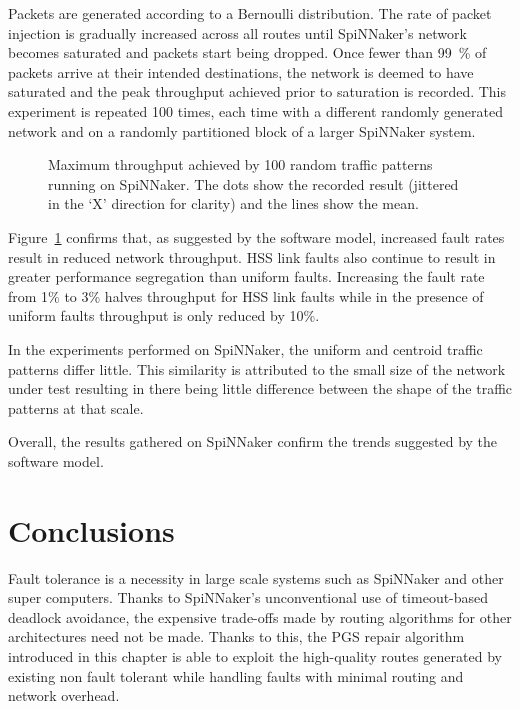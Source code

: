				Packets are generated according to a Bernoulli distribution. The rate
				of packet injection is gradually increased across all routes until
				SpiNNaker's network becomes saturated and packets start being dropped.
				Once fewer than \SI{99}{\percent} of packets arrive at their intended
				destinations, the network is deemed to have saturated and the peak
				throughput achieved prior to saturation is recorded. This experiment is
				repeated 100 times, each time with a different randomly generated
				network and on a randomly partitioned block of a larger SpiNNaker
				system.
				
				\begin{figure}
					\center
					
					\caption{Maximum throughput achieved by \num{100} random traffic
					patterns running on SpiNNaker. The dots show the recorded result
					(jittered in the `X' direction for clarity) and the lines show the
					mean.}
					\label{fig:routing-hardware}
				\end{figure}
				
				Figure~\ref{fig:routing-hardware} confirms that, as suggested by the
				software model, increased fault rates result in reduced network
				throughput. HSS link faults also continue to result in greater
				performance segregation than uniform faults. Increasing the fault rate
				from 1\% to 3\% halves throughput for HSS link faults while in the
				presence of uniform faults throughput is only reduced by 10\%.
				
				In the experiments performed on SpiNNaker, the uniform and centroid
				traffic patterns differ little. This similarity is attributed to the
				small size of the network under test resulting in there being little
				difference between the shape of the traffic patterns at that scale.
				
				Overall, the results gathered on SpiNNaker confirm the trends suggested
				by the software model.
		
	\section{Conclusions}
		
		Fault tolerance is a necessity in large scale systems such as SpiNNaker and
		other super computers. Thanks to SpiNNaker's unconventional use of
		timeout-based deadlock avoidance, the expensive trade-offs made by routing
		algorithms for other architectures need not be made. Thanks to this, the
		PGS repair algorithm introduced in this chapter is able to exploit the
		high-quality routes generated by existing non fault tolerant while handling
		faults with minimal routing and network overhead.
		

